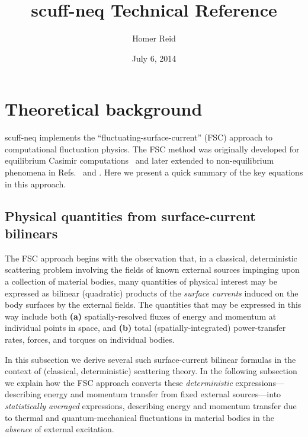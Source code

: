 \documentclass[letterpaper]{article}
\title {{\sc scuff-neq} Technical Reference}
\author {Homer Reid}
\date {July 6, 2014}
\begin{document}
\pagestyle{myheadings}
\maketitle

\tableofcontents

\newpage
\section{Theoretical background}

{\sc scuff-neq} implements the ``fluctuating-surface-current''
(FSC) approach to computational fluctuation physics. The 
FSC method was originally developed for equilibrium Casimir
computations~\cite{Reid2009, Reid2011, Reid2013B} and later
extended to non-equilibrium phenomena in 
Refs.~ and .
Here we present a quick summary of the key equations in this
approach.

\subsection{Physical quantities from surface-current bilinears}

The FSC approach begins with the observation that, in a 
classical, deterministic scattering problem involving the 
fields of known external sources impinging upon a collection
of material bodies, many quantities of physical interest 
may be expressed as bilinear (quadratic) products of the 
\textit{surface currents} induced on the body surfaces by 
the external fields. The quantities that may be expressed
in this way include both \textbf{(a)} spatially-resolved 
fluxes of energy and momentum at individual points in space,
and \textbf{(b)} total (spatially-integrated) power-transfer 
rates, forces, and torques on individual bodies.

In this subsection we derive several such surface-current 
bilinear formulas in the context of (classical, deterministic)
scattering theory. In the following subsection we explain how 
the FSC approach converts these \textit{deterministic} 
expressions---describing energy and momentum transfer
from fixed external sources---into \textit{statistically averaged} 
expressions, describing energy and momentum transfer
due to thermal and quantum-mechanical fluctuations
in material bodies in the \textit{absence} of external
excitation.
\end{document}
